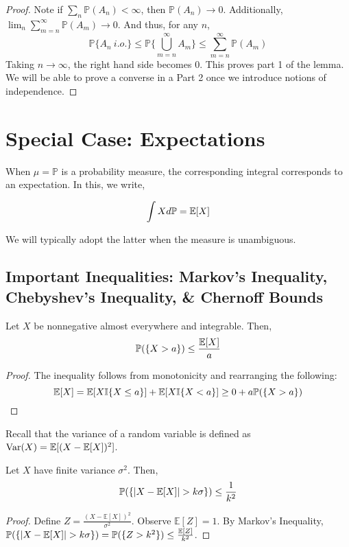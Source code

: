     \begin{proof}
        Note if $\sum_n \mathbb P(A_n) < \infty$, then $\mathbb P(A_n) \to 0$. Additionally, 
        $\lim_n \sum_{m=n}^\infty \mathbb P(A_m) \to 0$. And thus, for any $n$,
        \[ \mathbb P\{A_n \: i.o.\} \leq \mathbb P\{\bigcup_{m=n}^\infty A_m\} \leq \sum_{m = n}^\infty \mathbb P(A_m) \]
        Taking $n \to \infty$, the right hand side becomes $0$. This proves part 1 of the lemma. We will 
        be able to prove a converse in a Part 2 once we introduce notions of independence.
    \end{proof}

    \section{Special Case: Expectations}

    When $\mu = \mathbb P$ is a probability measure, the corresponding integral corresponds to an expectation. 
    In this, we write, 

    \[ \int X d\mathbb P = \mathbb E[X] \]

    We will typically adopt the latter when the measure is unambiguous. 

    \subsection{Important Inequalities: Markov's Inequality, Chebyshev's Inequality, \& Chernoff Bounds}

    \begin{theorem}\label{thm:markov_inequality}
        Let $X$ be nonnegative almost everywhere and integrable. Then, 
        \[ \mathbb P(\{X > a\}) \leq \frac{\mathbb E[X]}{a} \]
    \end{theorem}
    \begin{proof}
        The inequality follows from monotonicity and rearranging the following:
        \[ \mathbb E[X] = \mathbb E[X\mathbb I\{X \leq a\}] + \mathbb E[X\mathbb I\{X < a\}] \geq 0 + a \mathbb P(\{X > a\})\]
    \end{proof}

    Recall that the variance of a random variable is defined as 
    $\text{Var}(X) = \mathbb E[(X - \mathbb E[X])^2]$.

    \begin{corollary}
        Let $X$ have finite variance $\sigma^2$. Then, 
        \[ \mathbb P(\{|X - \mathbb E[X]| > k\sigma \}) \leq \frac{1}{k^2} \]
    \end{corollary}
    \begin{proof}
        Define $Z = \frac{(X - \mathbb E[X])^2}{\sigma^2}$. Observe 
        $\mathbb E[Z] = 1$. By Markov's Inequality, $\mathbb P(\{|X - \mathbb E[X]| > k\sigma \}) = \mathbb P(\{ Z > k^2 \}) \leq \frac{\mathbb E[Z]}{k^2}$. 
    \end{proof}

